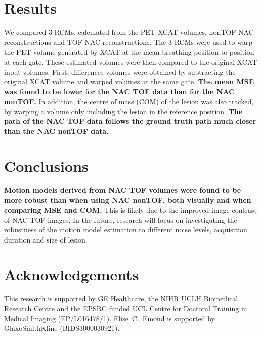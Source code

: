 \documentclass[portrait,color=UCLburgundy,margin=2cm]{uclposter}
\begin{document}
\begin{multicols}{4}
\large

\section*{Results}
We compared $3$ RCMs, calculated from the PET XCAT volumes, nonTOF NAC reconstructions and TOF NAC reconstructions. The $3$ RCMs were used to warp the PET volume generated by XCAT at the mean breathing position to position at each gate. These estimated volumes were then compared to the original XCAT input volumes. First, differences volumes were obtained by subtracting the original XCAT volume and warped volumes at the same gate. \textcolor{UCLburgundy}{\textbf{The mean MSE was found to be lower for the NAC TOF data than for the NAC nonTOF.}} In addition, the centre of mass (COM) of the lesion was also tracked, by warping a volume only including the lesion in the reference position. \textcolor{UCLburgundy}{\textbf{The path of the NAC TOF data follows the ground truth path much closer than the NAC nonTOF data.}}

\section*{Conclusions}
\textcolor{UCLburgundy}{\textbf{Motion models derived from NAC TOF volumes were found to be more robust than when using NAC nonTOF, both visually and when comparing MSE and COM.}} This is likely due to the improved image contrast of NAC TOF images. In the future, research will focus on investigating the robustness of the motion model estimation to different noise levels, acquisition duration and size of lesion.

\AtNextBibliography{\small}
\printbibliography

\small
\section*{Acknowledgements}
This research is supported by GE Healthcare, the NIHR UCLH Biomedical Research Centre and the EPSRC funded UCL Centre for Doctoral Training in Medical Imaging (EP/L016478/1).
Elise~C.~Emond is supported by GlaxoSmithKline (BIDS3000030921).

\end{multicols}
\end{document}
